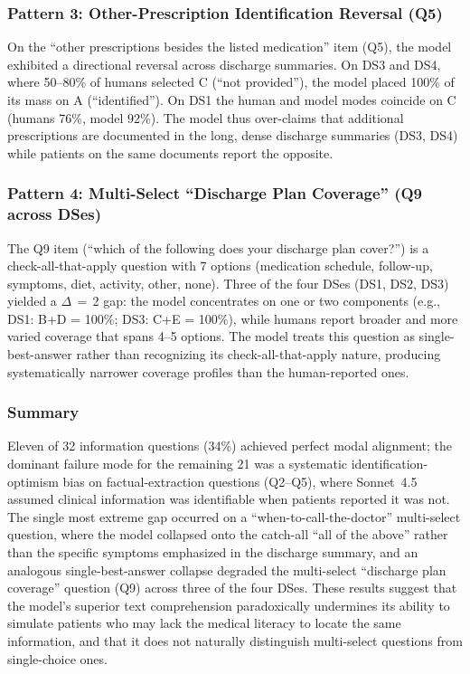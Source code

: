 \subsubsection{Pattern 3: Other-Prescription Identification Reversal (Q5)}

On the ``other prescriptions besides the listed medication'' item (Q5),
the model exhibited a directional reversal across discharge summaries.
On DS3 and DS4, where 50--80\% of humans selected C (``not provided''),
the model placed 100\% of its mass on A (``identified''). On DS1 the
human and model modes coincide on C (humans 76\%, model 92\%). The model
thus over-claims that additional prescriptions are documented in the long,
dense discharge summaries (DS3, DS4) while patients on the same documents
report the opposite.

\subsubsection{Pattern 4: Multi-Select ``Discharge Plan Coverage'' (Q9 across DSes)}

The Q9 item (``which of the following does your discharge plan cover?'')
is a check-all-that-apply question with 7 options (medication schedule,
follow-up, symptoms, diet, activity, other, none). Three of the four DSes
(DS1, DS2, DS3) yielded a $\Delta$\,$=$\,2 gap: the model concentrates on
one or two components (e.g., DS1: B+D = 100\%; DS3: C+E = 100\%), while
humans report broader and more varied coverage that spans 4--5 options.
The model treats this question as single-best-answer rather than recognizing
its check-all-that-apply nature, producing systematically narrower coverage
profiles than the human-reported ones.

\subsubsection{Summary}

Eleven of 32 information questions (34\%) achieved perfect modal alignment;
the dominant failure mode for the remaining 21 was a systematic
identification-optimism bias on factual-extraction questions (Q2--Q5),
where Sonnet~4.5 assumed clinical information was identifiable when
patients reported it was not. The single most extreme gap occurred on a
``when-to-call-the-doctor'' multi-select question, where the model
collapsed onto the catch-all ``all of the above'' rather than the
specific symptoms emphasized in the discharge summary, and an analogous
single-best-answer collapse degraded the multi-select ``discharge plan
coverage'' question (Q9) across three of the four DSes. These results
suggest that the model's superior text comprehension paradoxically
undermines its ability to simulate patients who may lack the medical
literacy to locate the same information, and that it does not naturally
distinguish multi-select questions from single-choice ones.
